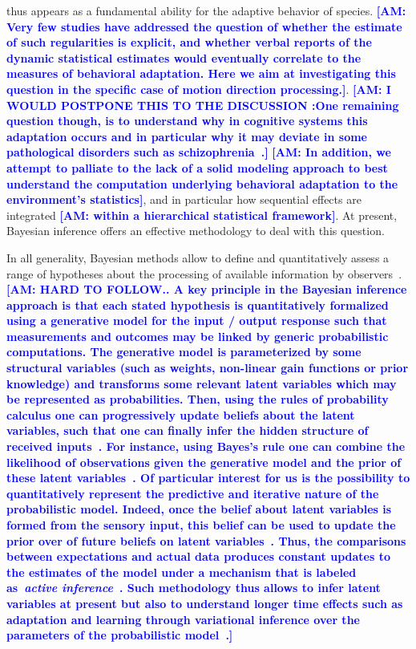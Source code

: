 \documentclass[12pt,english]{article}%
\newcommand{\citep}[1]{\parencite{#1}}
\newcommand{\AM}[1]{\textbf{\textcolor{blue}{[AM: #1]}}}
\begin{document}
thus appears as a fundamental ability
for the adaptive behavior of species. \AM{Very few studies have addressed the question of whether 
the estimate of such regularities is explicit, and whether verbal reports of the dynamic statistical
estimates would eventually correlate to the measures of behavioral adaptation. Here we aim at investigating this question in the specific case of motion direction processing.}.  
\AM{I WOULD POSTPONE THIS TO THE DISCUSSION :One remaining question though, is to understand why in cognitive systems
this adaptation occurs and
in particular why it may deviate
in some pathological disorders such as schizophrenia~\citep{Adams12}.}
\AM{In addition, we attempt to palliate to the lack of a solid modeling approach to best understand the computation underlying behavioral adaptation to the environment's statistics},
and in particular how sequential effects are integrated \AM{within a hierarchical statistical framework}.
At present, Bayesian inference offers an effective methodology
to deal with this question.

In all generality, Bayesian methods allow to define and quantitatively assess
a range of hypotheses about the processing
of available information by observers~\citep{Deneve1999, Diaconescu2014, Daunizeau10a}.
\AM{HARD TO FOLLOW.. A key principle in the Bayesian inference approach is
that each stated hypothesis is quantitatively formalized
using a generative model for the input / output response
such that measurements and outcomes may be linked by
generic probabilistic computations.
The generative model is parameterized by some structural variables
(such as weights, non-linear gain functions or prior knowledge)
and transforms some relevant latent variables
which may be represented as probabilities.
Then, using the rules of probability calculus
one can progressively update beliefs about the latent variables,
such that one can finally infer the hidden structure of received inputs~\citep{Hoyer2003, Ma2014}.
For instance, using Bayes's rule one can combine
the likelihood of observations given the generative model and
the prior of these latent variables~\citep{Janes2014}.
Of particular interest for us is the possibility to
quantitatively represent
the predictive and iterative nature of the probabilistic model.
Indeed, once the belief about latent variables
is formed from the sensory input,
this belief can be used to update
the prior over of future beliefs on latent variables~\citep{Montagnini2007}.
Thus, the comparisons between expectations and actual data produces
constant updates to the estimates of the model under a mechanism
that is labeled as~\textit{active inference}~\citep{Friston2003, Friston2010}.
Such methodology thus allows to infer latent variables at present
but also to understand longer time effects such as adaptation and learning
through variational inference over
the parameters of the probabilistic model~\citep{ref}.}
\end{document}
